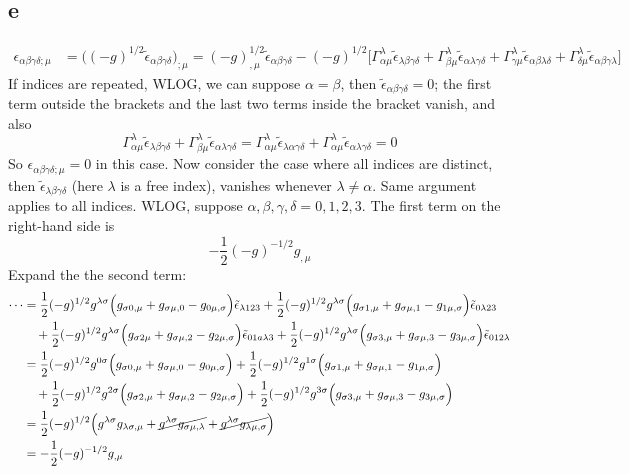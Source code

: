 \documentclass{article}
\begin{document}
\subsection*{e}
\begin{align*}
\epsilon_{\alpha\beta\gamma\delta;\mu} &= \Big((-g)^{1/2}\tilde{\epsilon}_{\alpha\beta\gamma\delta}\Big)_{;\mu}
	=(-g)^{1/2}_{,\mu}\tilde{\epsilon}_{\alpha\beta\gamma\delta} 
	- (-g)^{1/2}\Big[\Gamma_{\alpha\mu}^{\lambda} \tilde{\epsilon}_{\lambda\beta\gamma\delta}
	+ \Gamma_{\beta\mu}^{\lambda} \tilde{\epsilon}_{\alpha\lambda\gamma\delta}
	+ \Gamma_{\gamma\mu}^{\lambda} \tilde{\epsilon}_{\alpha\beta\lambda\delta}
	+ \Gamma_{\delta\mu}^{\lambda} \tilde{\epsilon}_{\alpha\beta\gamma\lambda}\Big]
\end{align*}
If indices are repeated, WLOG, we can suppose $\alpha = \beta$, then $\tilde{\epsilon}_{\alpha\beta\gamma\delta}  = 0$; the first term outside the brackets and the last two terms inside the bracket vanish, and also
\[ \Gamma_{\alpha\mu}^{\lambda} \tilde{\epsilon}_{\lambda\beta\gamma\delta}
	+ \Gamma_{\beta\mu}^{\lambda} \tilde{\epsilon}_{\alpha\lambda\gamma\delta} 
= \Gamma_{\alpha\mu}^{\lambda} \tilde{\epsilon}_{\lambda\alpha\gamma\delta}
	+ \Gamma_{\alpha\mu}^{\lambda} \tilde{\epsilon}_{\alpha\lambda\gamma\delta} = 0 \]
So $\epsilon_{\alpha\beta\gamma\delta;\mu} = 0$ in this case. Now consider the case where all indices are distinct, then
$\tilde{\epsilon}_{\lambda\beta\gamma\delta}$ (here $\lambda$ is a free index), vanishes whenever $\lambda \neq \alpha$.
Same argument applies to all indices. WLOG, suppose $\alpha,\beta,\gamma,\delta = 0,1,2,3$. The first term on the right-hand side is
\[ -\frac{1}{2}(-g)^{-1/2}g_{,\mu} \]
Expand the the second term:
\begin{align*}
	\cdots &= \frac{1}{2}(-g)^{1/2}g^{\lambda\sigma} \Big(g_{\sigma0,\mu}+ g_{\sigma\mu,0} - g_{0\mu,\sigma}\Big) \tilde{\epsilon}_{\lambda123} + \frac{1}{2}(-g)^{1/2}g^{\lambda\sigma} \Big(g_{\sigma1,\mu}+ g_{\sigma\mu,1} - g_{1\mu,\sigma}\Big) \tilde{\epsilon}_{0\lambda23}\\
	&\quad+ \frac{1}{2}(-g)^{1/2}g^{\lambda\sigma} \Big(g_{\sigma2\mu}+ g_{\sigma\mu,2} - g_{2\mu,\sigma}\Big) \tilde{\epsilon}_{01a\lambda3} + \frac{1}{2}(-g)^{1/2}g^{\lambda\sigma} \Big(g_{\sigma3,\mu}+ g_{\sigma\mu,3} - g_{3\mu,\sigma}\Big) \tilde{\epsilon}_{012\lambda}\\
	&= \frac{1}{2}(-g)^{1/2}g^{0\sigma} \Big(g_{\sigma0,\mu}+ g_{\sigma\mu,0} - g_{0\mu,\sigma}\Big) + \frac{1}{2}(-g)^{1/2}g^{1\sigma} \Big(g_{\sigma1,\mu}+ g_{\sigma\mu,1} - g_{1\mu,\sigma}\Big) \\
	&\quad+ \frac{1}{2}(-g)^{1/2}g^{2\sigma} \Big(g_{\sigma2,\mu}+ g_{\sigma\mu,2} - g_{2\mu,\sigma}\Big) + \frac{1}{2}(-g)^{1/2}g^{3\sigma} \Big(g_{\sigma3,\mu}+ g_{\sigma\mu,3} - g_{3\mu,\sigma}\Big)\\
	&= \frac{1}{2} (-g)^{1/2} \Big( g^{\lambda\sigma}g_{\lambda\sigma,\mu} +\cancel{g^{\lambda\sigma}g_{\sigma\mu,\lambda}} + \cancel{g^{\lambda\sigma}g_{\lambda\mu,\sigma}}\Big)\\
	&= - \frac{1}{2}(-g)^{-1/2}g_{,\mu}
\end{align*}
\end{document}
